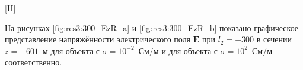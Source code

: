 \documentclass[a4paper,14pt]{article}
\makeatletter
\renewenvironment{figure}[1][\fps@figure]{
  \edef\@tempa{\noexpand\@float{figure}[#1]}
  \@tempa
  \addtocounter{foofigure}{1}
}{
  \end@float
}
\renewcommand{\Re}{\mathop{\mathrm{Re}}\nolimits}
\makeatother
\begin{document}
\begin{figure}[H]
	\centering
	\text{~~}
	\caption{$\Re(\mathbf{E}_y)$ при $l_2=-300$}
	\label{fig:res3:300_EyR}
\end{figure}

На рисунках \ref{fig:res3:300_EzR_a} и \ref{fig:res3:300_EzR_b} показано графическое представление напряжённости электрического поля $\mathbf{E}$ при $l_2=-300$ в сечении $z=-601$~м для объекта с $\sigma=10^{-2}$~См/м и для объекта с $\sigma=10^{2}$~См/м соответственно.
\end{document}
